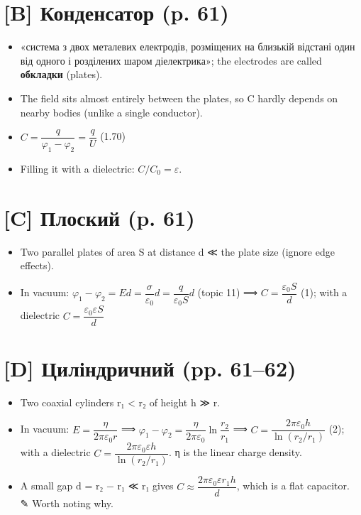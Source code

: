 \documentclass[11pt,a4paper,oneside]{book}
\newcommand{\pen}{{\sffamily\color{accent}✎}}
\begin{document}
\section*{[B] Конденсатор (p. 61)}
\begin{itemize}
\item «система з двох металевих електродів, розміщених на близькій відстані один від одного і розділених шаром діелектрика»; the electrodes are called \textbf{обкладки} (plates).
\item The field sits almost entirely between the plates, so C hardly depends on nearby bodies (unlike a single conductor).
\item $C = \dfrac{q}{\varphi_1-\varphi_2} = \dfrac{q}{U}$ (1.70)
\item Filling it with a dielectric: $C/C_0 = \varepsilon$.
\end{itemize}

\section*{[C] Плоский (p. 61)}
\begin{itemize}
\item Two parallel plates of area S at distance d ≪ the plate size (ignore edge effects).
\item In vacuum: $\varphi_1-\varphi_2 = Ed = \dfrac{\sigma}{\varepsilon_0}d = \dfrac{q}{\varepsilon_0S}d$ (topic 11) ⟹ $C = \dfrac{\varepsilon_0S}{d}$ (1); with a dielectric $C = \dfrac{\varepsilon_0\varepsilon S}{d}$
\end{itemize}

\section*{[D] Циліндричний (pp. 61–62)}
\begin{itemize}
\item Two coaxial cylinders r₁ < r₂ of height h ≫ r.
\item In vacuum: $E = \dfrac{\eta}{2\pi\varepsilon_0 r}$ ⟹ $\varphi_1-\varphi_2 = \dfrac{\eta}{2\pi\varepsilon_0}\ln\dfrac{r_2}{r_1}$ ⟹ $C = \dfrac{2\pi\varepsilon_0h}{\ln(r_2/r_1)}$ (2); with a dielectric $C = \dfrac{2\pi\varepsilon_0\varepsilon h}{\ln(r_2/r_1)}$. η is the linear charge density.
\item A small gap d = r₂ − r₁ ≪ r₁ gives $C\approx\dfrac{2\pi\varepsilon_0\varepsilon r_1h}{d}$, which is a flat capacitor. \pen{} Worth noting why.
\end{itemize}
\end{document}
